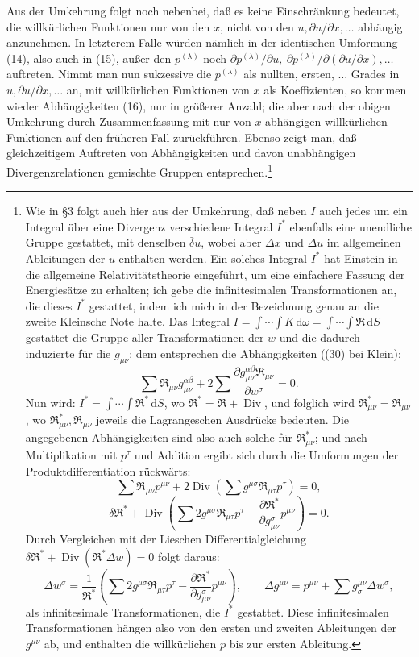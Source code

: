 \documentclass[11pt]{article}
\newcommand{\D}{\Delta}
\providecommand{\dd}{\mathrm d}
\providecommand{\Div}{\operatorname{Div}}
\providecommand{\bd}{\bar{\delta}}
\providecommand{\p}{\partial}
\providecommand{\p}{\partial}
\providecommand{\dd}{\mathrm d}
\begin{document}
Aus der Umkehrung folgt noch nebenbei, daß es keine Einschränkung bedeutet, die willkürlichen Funktionen nur von den \(x\), nicht von den \(u,\p u/\p x,\ldots\) abhängig anzunehmen. In letzterem Falle würden nämlich in der identischen Umformung (14), also auch in (15), außer den \(p^{(\lambda)}\) noch \(\p p^{(\lambda)}/\p u,\ \p p^{(\lambda)}/\p(\p u/\p x),\ldots\) auftreten. Nimmt man nun sukzessive die \(p^{(\lambda)}\) als nullten, ersten, \(\ldots\) Grades in \(u,\p u/\p x,\ldots\) an, mit willkürlichen Funktionen von \(x\) als Koeffizienten, so kommen wieder Abhängigkeiten (16), nur in größerer Anzahl; die aber nach der obigen Umkehrung durch Zusammenfassung mit nur von \(x\) abhängigen willkürlichen Funktionen auf den früheren Fall zurückführen. Ebenso zeigt man, daß gleichzeitigem Auftreten von Abhängigkeiten und davon unabhängigen Divergenzrelationen gemischte Gruppen entsprechen.\footnote{Wie in \S{}3 folgt auch hier aus der Umkehrung, daß neben \(I\) auch jedes um ein Integral über eine Divergenz verschiedene Integral \(I^*\) ebenfalls eine unendliche Gruppe gestattet, mit denselben \(\bd u\), wobei aber \(\D x\) und \(\D u\) im allgemeinen Ableitungen der \(u\) enthalten werden. Ein solches Integral \(I^*\) hat Einstein in die allgemeine Relativitätstheorie eingeführt, um eine einfachere Fassung der Energiesätze zu erhalten; ich gebe die infinitesimalen Transformationen an, die dieses \(I^*\) gestattet, indem ich mich in der Bezeichnung genau an die zweite Kleinsche Note halte. Das Integral \(I=\int\!\cdots\!\int K\,\dd\omega=\int\!\cdots\!\int \mathfrak{R}\,\dd S\) gestattet die Gruppe aller Transformationen der \(w\) und die dadurch induzierte für die \(g_{\mu\nu}\); dem entsprechen die Abhängigkeiten ((30) bei Klein):
\[
\sum \mathfrak{R}_{\mu\nu}g_{\mu\nu}^{\alpha\beta}
+2\sum\frac{\p g_{\mu\nu}^{\alpha\beta}\mathfrak{R}_{\mu\nu}}{\p w^\sigma}=0.
\]
Nun wird: \(I^*=\int\!\cdots\!\int \mathfrak{R}^*\,\dd S\), wo \(\mathfrak{R}^*=\mathfrak{R}+\Div\), und folglich wird \(\mathfrak{R}_{\mu\nu}^*=\mathfrak{R}_{\mu\nu}\), wo \(\mathfrak{R}_{\mu\nu}^*,\mathfrak{R}_{\mu\nu}\) jeweils die Lagrangeschen Ausdrücke bedeuten. Die angegebenen Abhängigkeiten sind also auch solche für \(\mathfrak{R}_{\mu\nu}^*\); und nach Multiplikation mit \(p^\tau\) und Addition ergibt sich durch die Umformungen der Produktdifferentiation rückwärts:
\[
\sum \mathfrak{R}_{\mu\nu}p^{\mu\nu}
+2\Div\!\left(\sum g^{\mu\sigma}\mathfrak{R}_{\mu\tau}p^\tau\right)=0,
\]
\[
\delta\mathfrak{R}^*+\Div\!\left(\sum 2g^{\mu\sigma}\mathfrak{R}_{\mu\tau}p^\tau
-\frac{\p\mathfrak{R}^*}{\p g_{\mu\nu}^{\sigma}}p^{\mu\nu}\right)=0.
\]
Durch Vergleichen mit der Lieschen Differentialgleichung
\(\delta\mathfrak{R}^*+\Div(\mathfrak{R}^*\D w)=0\) folgt daraus:
\[
\D w^\sigma=\frac1{\mathfrak{R}^*}\left(\sum 2g^{\mu\sigma}\mathfrak{R}_{\mu\tau}p^\tau
-\frac{\p\mathfrak{R}^*}{\p g_{\mu\nu}^{\sigma}}p^{\mu\nu}\right),
\qquad
\D g^{\mu\nu}=p^{\mu\nu}+\sum g^{\mu\nu}_{\sigma}\D w^\sigma,
\]
als infinitesimale Transformationen, die \(I^*\) gestattet. Diese infinitesimalen Transformationen hängen also von den ersten und zweiten Ableitungen der \(g^{\mu\nu}\) ab, und enthalten die willkürlichen \(p\) bis zur ersten Ableitung.}
\end{document}

